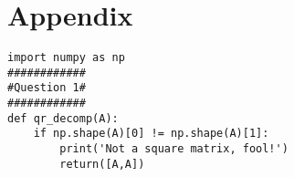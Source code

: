 \documentclass[10pt,a4paper]{article}
\begin{document}
\section{Appendix}
\begin{verbatim}
import numpy as np                                                                                                                                                                        
############                                                                                                                                                                               
#Question 1#                                                                                                                                                                               
############                                                                                                                                                                               
def qr_decomp(A):                                                                                                                                                                          
    if np.shape(A)[0] != np.shape(A)[1]:                                                                                                                                                   
        print('Not a square matrix, fool!')                                                                                                                                                
        return([A,A])                                                                                                                                                                      
                                                                                                                                                                                           

\end{verbatim}
\end{document}
